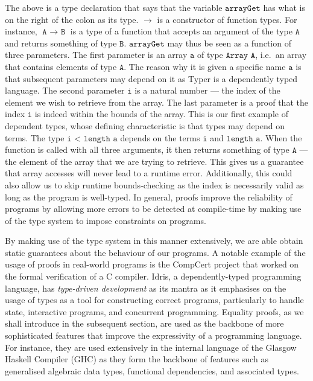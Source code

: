\documentclass[12pt,twoside,maitrise]{dms}
\theoremstyle{definition}
\numberwithin{equation}{section}
\numberwithin{table}{chapter}
\numberwithin{figure}{chapter}
\newcommand\id[1] {\texttt{#1}}
\newcommand\fn[1] {\texttt{#1}}
\begin{document}
The above is a type declaration that says that the variable $\fn{arrayGet}$ has
what is on the right of the colon as its type. $\rightarrow$ is a constructor of
function types. For instance, $\fn{A $\rightarrow$ B}$ is a type of a function
that accepts an argument of the type $\fn{A}$ and returns something of type
$\fn{B}$. $\fn{arrayGet}$ may thus be seen as a function of three parameters.
The first parameter is an array $\fn{a}$ of type $\fn{Array A}$, i.e.\ an array
that contains elements of type $\fn{A}$. The reason why it is given a specific
name $\fn{a}$ is that subsequent parameters may depend on it as Typer is a
dependently typed language. The second parameter $\fn{i}$ is a natural number
--- the index of the element we wish to retrieve from the array. The last
parameter is a proof that the index $\id{i}$ is indeed within the bounds of the
array. This is our first example of dependent types, whose defining
characteristic is that types may depend on terms. The type $\fn{i < length a}$
depends on the terms $\fn{i}$ and $\fn{length a}$. When the function is called
with all three arguments, it then returns something of type $\fn{A}$ --- the
element of the array that we are trying to retrieve. This gives us a guarantee
that array accesses will never lead to a runtime error. Additionally, this could
also allow us to skip runtime bounds-checking as the index is necessarily valid
as long as the program is well-typed. In general, proofs improve the reliability
of programs by allowing more errors to be detected at compile-time by making use
of the type system to impose constraints on programs.

By making use of the type system in this manner extensively, we are able obtain
static guarantees about the behaviour of our programs. A notable example of the
usage of proofs in real-world programs is the CompCert project that worked on
the formal verification of a C compiler\cite{Leroy-Compcert-CACM}. Idris, a
dependently-typed programming language, has \emph{type-driven development} as
its mantra as it emphasises on the usage of types as a tool for constructing
correct programs, particularly to handle state, interactive programs, and
concurrent programming. Equality proofs, as we shall introduce in the subsequent
section, are used as the backbone of more sophisticated features that improve
the expressivity of a programming language. For instance, they are used
extensively in the internal language of the Glasgow Haskell Compiler (GHC) as
they form the backbone of features such as generalised algebraic data types,
functional dependencies, and associated types\cite{sulzmann2007systemfeq}.
\end{document}

